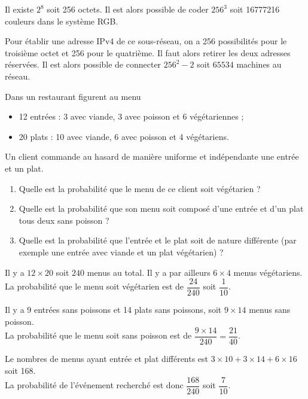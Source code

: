 \documentclass[11pt,fleqn, openany]{book} %
\begin{document}
\begin{solution}Il existe $2^8$ soit 256 octets. Il est alors possible de coder $256^3$ soit 16777216 couleurs dans le système RGB.

Pour établir une adresse IPv4 de ce sous-réseau, on a 256 possibilités pour le troisième octet et 256 pour le quatrième. Il faut alors retirer les deux adresses réservées. Il est alors possible de connecter $256^2-2$ soit $65534$ machines au réseau.\end{solution}




\begin{exercise}Dans un restaurant figurent au menu
\begin{itemize}
\item 12 entrées : 3 avec viande, 3 avec poisson et 6 végétariennes ;
\item 20 plats : 10 avec viande, 6 avec poisson et 4 végétariens.
\end{itemize}
Un client commande au hasard de manière uniforme et indépendante une entrée et un plat.
\begin{enumerate}
\item Quelle est la probabilité que le menu de ce client soit végétarien ?
\item Quelle est la probabilité que son menu soit composé d'une entrée et d'un plat tous deux sans poisson ?
\item Quelle est la probabilité que l'entrée et le plat soit de nature différente (par exemple une entrée avec viande et un plat végétarien) ?
\end{enumerate}\end{exercise}

\begin{solution}Il y a $12 \times 20$ soit $240$ menus au total. Il y a par ailleurs $6 \times 4$ menus végétariens. \\La probabilité que le menu soit végétarien est de $\dfrac{24}{240}$ soit $\dfrac{1}{10}$.

Il y a 9 entrées sans poissons et 14 plats sans poissons, soit $9\times 14$ menus sans poisson. \\La probabilité que le menu soit sans poisson est de $\dfrac{9\times 14}{240}=\dfrac{21}{40}$.

Le nombres de menus ayant entrée et plat différents est $3 \times 10+3 \times 14 +6 \times 16$ soit 168. \\La probabilité de l'événement recherché est donc $\dfrac{168}{240}$ soit $\dfrac{7}{10}$.\end{solution}
\end{document}
